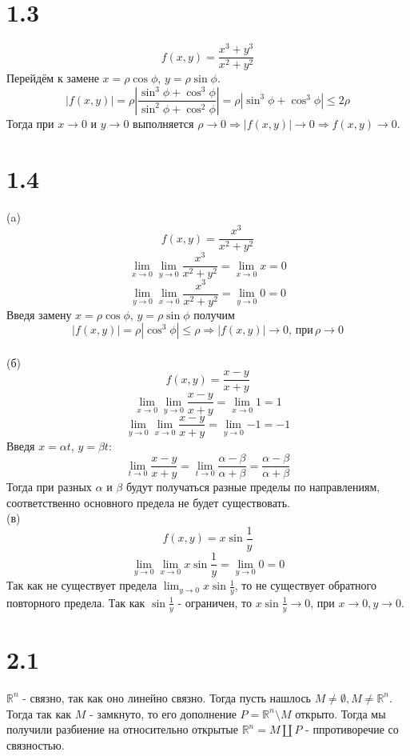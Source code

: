 \documentclass[12pt]{article}
\begin{document}
\section{1.3}
$$f(x, y) = \frac{x^3 + y^3}{x^2 + y^2}$$
Перейдём к замене $x = \rho\cos{\phi}$, $y = \rho\sin{\phi}$.
$$
|f(x, y)| = \rho |\frac{\sin^3{\phi} + \cos^3{\phi}}{\sin^2{\phi} + \cos^2{\phi}}| = \rho |\sin^3{\phi} + \cos^3{\phi}| \leq 2\rho
$$
Тогда при $x \to 0$ и $y \to 0$ выполняется $\rho \to 0 \Rightarrow |f(x, y)| \to 0 \Rightarrow f(x, y) \to 0$. 

\section{1.4}
(a) $$f(x, y) = \frac{x^3}{x^2 + y^2}$$
$$\lim_{x \to 0}{\lim_{y \to 0}{\frac{x^3}{x^2 + y^2}}} = \lim_{x \to 0}{x} = 0$$
$$\lim_{y \to 0}{\lim_{x \to 0}{\frac{x^3}{x^2 + y^2}}} = \lim_{y \to 0}{0} = 0$$
Введя замену $x = \rho\cos{\phi}$, $y = \rho\sin{\phi}$ получим 
$$|f(x, y)| = \rho |\cos^3{\phi}| \leq \rho \Rightarrow |f(x, y)| \to 0, \, \textrm{при} \, \rho \to 0$$ \\
(б) $$f(x, y) = \frac{x - y}{x + y}$$
$$\lim_{x \to 0}{\lim_{y \to 0}\frac{x - y}{x + y}} = \lim_{x \to 0}{1} = 1$$
$$\lim_{y \to 0}{\lim_{x \to 0}\frac{x - y}{x + y}} = \lim_{y \to 0}{-1} = -1$$
Введя $x = \alpha t$, $y = \beta t$:
$$
\lim_{t \to 0}{\frac{x - y}{x + y}} = \lim_{t \to 0}{\frac{\alpha - \beta}{\alpha + \beta}} = \frac{\alpha - \beta}{\alpha + \beta}
$$
Тогда при разных $\alpha$ и $\beta$ будут получаться разные пределы по направлениям, соответственно основного предела не будет существовать. \\
(в) $$f(x, y) = x\sin{\frac{1}{y}}$$
$$\lim_{y \to 0}{\lim_{x \to 0}{x\sin{\frac{1}{y}}}} = \lim_{y \to 0}{0} = 0$$
Так как не существует предела $\lim_{y \to 0}{x\sin{\frac{1}{y}}}$, то не существует обратного повторного предела.
Так как $\sin{\frac{1}{y}}$ - ограничен, то $x\sin{\frac{1}{y}} \to 0$, при $x \to 0, y \to 0$.

\section{2.1}
$\mathbb{R}^n$ - связно, так как оно линейно связно.
Тогда пусть нашлось $M \not = \emptyset, M \not = \mathbb{R}^n$. Тогда так как $M$ - замкнуто, то его дополнение $P = \mathbb{R}^n \setminus M$ 
открыто. Тогда мы получили разбиение на относительно открытые $\mathbb{R}^n = M \coprod P$ - ппротиворечие со связностью.
\end{document}
